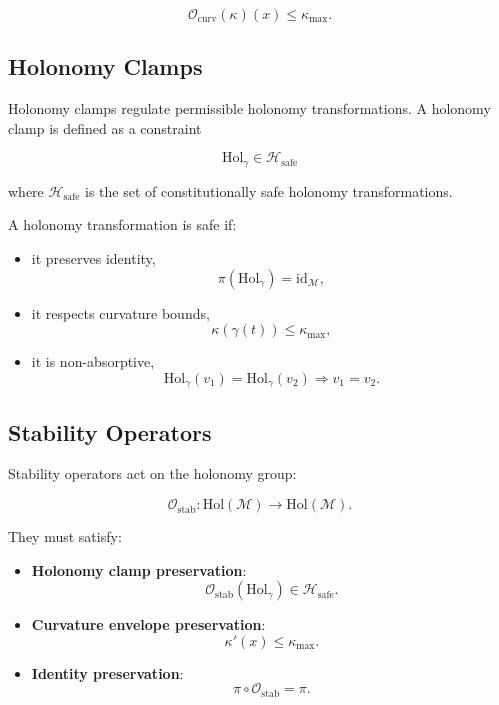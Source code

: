\[
\mathcal{O}_{\mathrm{curv}}(\kappa)(x) \le \kappa_{\max}.
\]


\subsection{Holonomy Clamps}

Holonomy clamps regulate permissible holonomy transformations. A holonomy
clamp is defined as a constraint

\[
\mathrm{Hol}_\gamma \in \mathcal{H}_{\mathrm{safe}}
\]

where $\mathcal{H}_{\mathrm{safe}}$ is the set of constitutionally safe
holonomy transformations.

A holonomy transformation is safe if:

\begin{itemize}
    \item it preserves identity,
    \[
    \pi(\mathrm{Hol}_\gamma) = \mathrm{id}_{\mathcal{M}},
    \]

    \item it respects curvature bounds,
    \[
    \kappa(\gamma(t)) \le \kappa_{\max},
    \]

    \item it is non-absorptive,
    \[
    \mathrm{Hol}_\gamma(v_1) = \mathrm{Hol}_\gamma(v_2)
    \Rightarrow v_1 = v_2.
    \]
\end{itemize}


\subsection{Stability Operators}

Stability operators act on the holonomy group:

\[
\mathcal{O}_{\mathrm{stab}} :
\mathrm{Hol}(\mathcal{M}) \to \mathrm{Hol}(\mathcal{M}).
\]

They must satisfy:

\begin{itemize}
    \item \textbf{Holonomy clamp preservation}:
    \[
    \mathcal{O}_{\mathrm{stab}}(\mathrm{Hol}_\gamma)
    \in \mathcal{H}_{\mathrm{safe}}.
    \]

    \item \textbf{Curvature envelope preservation}:
    \[
    \kappa'(x) \le \kappa_{\max}.
    \]

    \item \textbf{Identity preservation}:
    \[
    \pi \circ \mathcal{O}_{\mathrm{stab}} = \pi.
    \]
\end{itemize}

